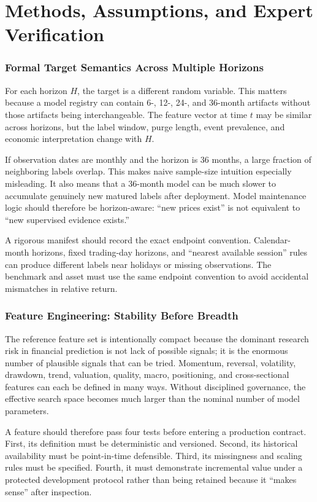 \documentclass[11pt]{article}
\begin{document}
\setcounter{section}{0}
\renewcommand{\thesection}{\arabic{section}}

\clearpage
\part{Methods, Assumptions, and Expert Verification}

\section{Formal Target Semantics Across Multiple Horizons}
For each horizon $H$, the target is a different random variable. This matters because a model registry can contain 6-, 12-, 24-, and 36-month artifacts without those artifacts being interchangeable. The feature vector at time $t$ may be similar across horizons, but the label window, purge length, event prevalence, and economic interpretation change with $H$.

If observation dates are monthly and the horizon is 36 months, a large fraction of neighboring labels overlap. This makes naive sample-size intuition especially misleading. It also means that a 36-month model can be much slower to accumulate genuinely new matured labels after deployment. Model maintenance logic should therefore be horizon-aware: ``new prices exist'' is not equivalent to ``new supervised evidence exists.''

A rigorous manifest should record the exact endpoint convention. Calendar-month horizons, fixed trading-day horizons, and ``nearest available session'' rules can produce different labels near holidays or missing observations. The benchmark and asset must use the same endpoint convention to avoid accidental mismatches in relative return.

\section{Feature Engineering: Stability Before Breadth}
The reference feature set is intentionally compact because the dominant research risk in financial prediction is not lack of possible signals; it is the enormous number of plausible signals that can be tried. Momentum, reversal, volatility, drawdown, trend, valuation, quality, macro, positioning, and cross-sectional features can each be defined in many ways. Without disciplined governance, the effective search space becomes much larger than the nominal number of model parameters.

A feature should therefore pass four tests before entering a production contract. First, its definition must be deterministic and versioned. Second, its historical availability must be point-in-time defensible. Third, its missingness and scaling rules must be specified. Fourth, it must demonstrate incremental value under a protected development protocol rather than being retained because it ``makes sense'' after inspection.
\end{document}
